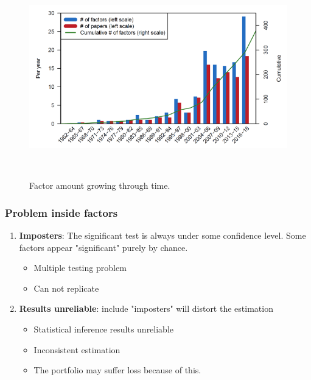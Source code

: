 \documentclass[12pt]{beamer}
\begin{document}
\begin{frame}[plain]
	\begin{figure}
\includegraphics[scale = 0.5]{figure/factor_growth.png}
\caption{Factor amount growing through time. }
	\cite{Harvey2019}\\
	\end{figure}
\end{frame}


\begin{frame}
\frametitle{Problem inside factors}
\begin{enumerate}
	\item  \textbf{Imposters}:
	The significant test is always under some confidence level.
	Some factors appear "significant" purely by chance.
			\begin{itemize}
                \item	Multiple testing problem
				\item  Can not replicate \cite{Hou2018}
			\end{itemize}
	\item \textbf{Results unreliable}: include "imposters" will distort the estimation
			\begin{itemize}
				\item Statistical inference results unreliable \cite{Gospodinov2017}
				\item Inconsistent estimation \cite{Anatolyev2018}
				\item The portfolio may suffer loss because of this.
			\end{itemize}
\end{enumerate}
\end{frame}
\end{document}
